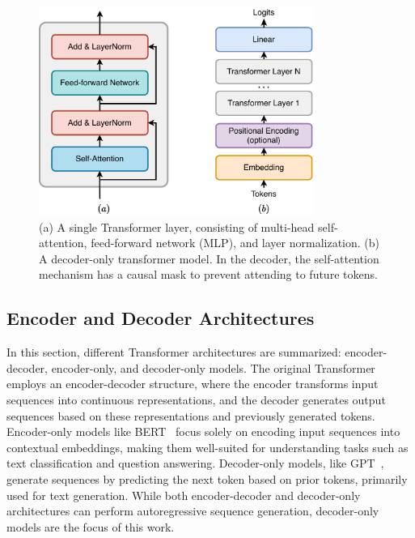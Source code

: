 \begin{figure}[h!]
    \centering
    \includegraphics[width=0.8\textwidth]{fig/transformer_layer.pdf}
    \caption{(a) A single Transformer layer, consisting of multi-head self-attention, feed-forward network (MLP), and layer normalization. (b) A decoder-only transformer model. In the decoder, the self-attention mechanism has a causal mask to prevent attending to future tokens.}
    \label{fig:transformer_layer}
\end{figure}


\subsection{Encoder and Decoder Architectures}\label{subsec:types_transformers}

In this section, different Transformer architectures are summarized: encoder-decoder, encoder-only, and decoder-only models. The original Transformer~\parencite{vaswani_attention_2017} employs an encoder-decoder structure, where the encoder transforms input sequences into continuous representations, and the decoder generates output sequences based on these representations and previously generated tokens. Encoder-only models like BERT~\parencite{devlin_bert_2019} focus solely on encoding input sequences into contextual embeddings, making them well-suited for understanding tasks such as text classification and question answering. Decoder-only models, like GPT~\parencite{radford_improving_2018}, generate sequences by predicting the next token based on prior tokens, primarily used for text generation. While both encoder-decoder and decoder-only architectures can perform autoregressive sequence generation, decoder-only models are the focus of this work.

